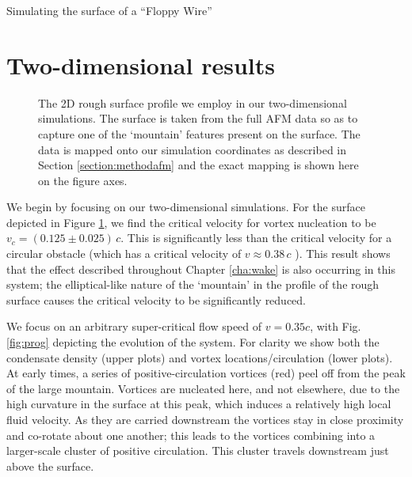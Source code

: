 \begin{chapter}{\label{cha:afm}Simulating the surface of a ``Floppy Wire''}
\section{Two-dimensional results}
\begin{figure}
  \centering
  \caption{\label{fig:surfprofile} The 2D rough surface profile we employ in our two-dimensional simulations. The surface is taken from the full AFM data so as to capture one of the `mountain' features present on the surface. The data is mapped onto our simulation coordinates as described in Section \ref{section:methodafm} and the exact mapping is shown here on the figure axes.}
\end{figure}

We begin by focusing on our two-dimensional simulations. For the surface depicted in Figure \ref{fig:surfprofile}, we find the critical velocity for vortex nucleation to be $v_c=(0.125\pm0.025)\,c$. This is significantly less than the critical velocity for a circular obstacle (which has a critical velocity of $v\approx 0.38\,c$ \cite{frisch92,nore93,win00,huepe00}). This result shows that the effect described throughout Chapter \ref{cha:wake} is also occurring in this system; the elliptical-like nature of the `mountain' in the profile of the rough surface causes the critical velocity to be significantly reduced.

We focus on an arbitrary super-critical flow speed of $v=0.35c$, with Fig. \ref{fig:prog} depicting the evolution of the system.  For clarity we show both the condensate density (upper plots) and vortex locations/circulation (lower plots).  At early times, a series of positive-circulation vortices (red) peel off from the peak of the large mountain. Vortices are nucleated here, and not elsewhere, due to the high curvature in the surface at this peak, which induces a relatively high local fluid velocity.  As they are carried downstream the vortices stay in close proximity and co-rotate about one another; this leads to the vortices combining into a larger-scale cluster of positive circulation.  This cluster travels downstream just above the surface.


\end{chapter}

